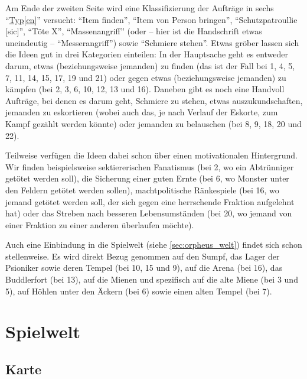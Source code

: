 \documentclass[a5paper,pagesize,numbers=noenddot]{scrbook}
\begin{document}
Am Ende der zweiten Seite wird eine Klassifizierung der Aufträge in sechs \enquote{\uline{Typ[en]}} versucht:
\enquote{Item finden}, \enquote{Item von Person bringen}, \enquote{Schutzpatroullie [sic]}, \enquote{Töte X}, \enquote{Massenangriff} (oder -- hier ist die Handschrift etwas uneindeutig -- \enquote{Messerangriff}) sowie \enquote{Schmiere stehen}.
Etwas gröber lassen sich die Ideen gut in drei Kategorien einteilen:
In der Hauptsache geht es entweder darum, etwas (beziehungsweise jemanden) zu finden (das ist der Fall bei 1, 4, 5, 7, 11, 14, 15, 17, 19 und 21) oder gegen etwas (beziehungsweise jemanden) zu kämpfen (bei 2, 3, 6, 10, 12, 13 und 16).
Daneben gibt es noch eine Handvoll Aufträge, bei denen es darum geht, Schmiere zu stehen, etwas auszukundschaften, jemanden zu eskortieren (wobei auch das, je nach Verlauf der Eskorte, zum Kampf gezählt werden könnte) oder jemanden zu belauschen (bei 8, 9, 18, 20 und 22).

Teilweise verfügen die Ideen dabei schon über einen motivationalen Hintergrund.
Wir finden beispielsweise sektiererischen Fanatismus (bei 2, wo ein Abtrünniger getötet werden soll), die Sicherung einer guten Ernte (bei 6, wo Monster unter den Feldern getötet werden sollen), machtpolitische Ränkespiele (bei 16, wo jemand getötet werden soll, der sich gegen eine herrschende Fraktion aufgelehnt hat) oder das Streben nach besseren Lebensumständen (bei 20, wo jemand von einer Fraktion zu einer anderen überlaufen möchte).

Auch eine Einbindung in die Spielwelt (siehe \autoref{sec:orpheus_welt}) findet sich schon stellenweise.
Es wird direkt Bezug genommen auf den Sumpf, das Lager der Psioniker sowie deren Tempel (bei 10, 15 und 9), auf die Arena (bei 16), das Buddlerfort (bei 13), auf die Mienen und spezifisch auf die alte Miene (bei 3 und 5), auf Höhlen unter den Äckern (bei 6) sowie einen alten Tempel (bei 7).


\clearpage
\section{Spielwelt}\label{sec:orpheus_welt}


\clearpage
\subsection{Karte}\label{sec:orpheus_welt_karte}
\end{document}
